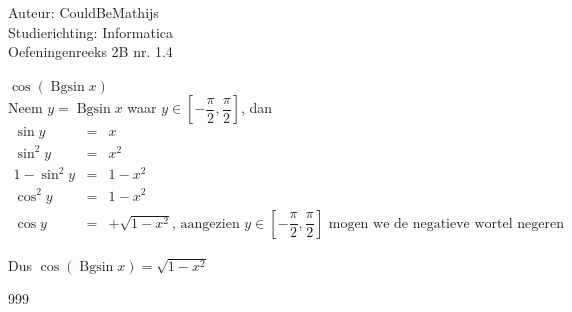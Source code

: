 \documentclass[a4paper]{article}
\newcommand{\Bgsin}{\operatorname{Bgsin}}
\begin{document}
\noindent \large Auteur: CouldBeMathijs \\
\noindent \large Studierichting: Informatica\\
\noindent \large Oefeningenreeks 2B nr. 1.4\\

\medskip

\normalsize

$\cos (\Bgsin x)$\\

Neem $y = \Bgsin x$ waar $y \in \left[-\dfrac{\pi}{2},\dfrac{\pi}{2}\right]$, dan\\

\begin{eqnarray*}
    \sin y &=& x\\
    \sin^2 y &=& x^2\\
    1 - \sin^2 y &=& 1 - x^2\\
    \cos^2 y &=& 1 - x^2\\
    \cos y &=& + \sqrt{1-x^2} \text{, aangezien } y \in \left[-\dfrac{\pi}{2},\dfrac{\pi}{2}\right] \text{ mogen we de negatieve wortel negeren}
\end{eqnarray*}

Dus $\cos(\Bgsin x) = \sqrt{1-x^2}$

\begin{thebibliography}{999}
\end{thebibliography}
\end{document}

